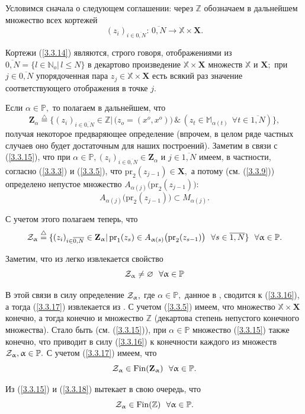 \documentclass[11pt,twoside,openany]{report}
\newcommand{\bfn}{\begin{equation}}
\newcommand{\efn}{\end{equation}}
\newcommand{\df}{\stackrel{\triangle}{=}}
\newcommand{\ov}{\overline}
\newcommand{\al}{\alpha}
\newcommand{\su}{\subset}
\newcommand{\fa}{\forall}
\newcommand{\cz}{{\cal Z}}
\newcommand{\bbz}{{\mathbb Z}}
\newcommand{\bbn}{{\mathbb N}}
\newcommand{\bbm}{{\mathbb M}}
\newcommand{\bbx}{{\mathbb X}}
\newcommand{\bbp}{{\mathbb P}}
\newcommand{\emp}{\varnothing}
\begin{document}
Условимся сначала о следующем соглашении:
через $\bbz$ обозначаем в дальнейшем
множество всех кортежей
\bfn
  \label{3.3.14}
  (z_i)_{i\in\ov{0,N}}:\,\ov{0,N}
  \longrightarrow \bbx\times \mathbf{X}
  .
\efn

Кортежи (\ref{3.3.14}) являются,
строго говоря,
отображениями из
$\ov{0,N} = \{l\in \bbn_o |\,l\leqslant N\}$
в декартово произведение $\bbx\times \mathbf{X}$
множеств $\bbx$ и $\mathbf{X};$
при $j\in \ov{0,N}$ упорядоченная пара
$z_j\in \bbx\times \mathbf{X}$
есть всякий раз значение соответствующего отображения в
точке $j.$

Если
$\al\in \bbp,$
то полагаем в дальнейшем, что
\bfn
  \label{3.3.15}
  \mathbf{Z}_\al \df \{(z_i)_{i\in\ov{0,N}}\in \bbz |\,\bigl(z_o =
  (x^o,x^o)\bigl)\,\&\,(z_t\in \bbm_{\al(t)}\ \ \fa t\in \ov{1,N})\}
  ,
\efn
получая некоторое предваряющее определение
(впрочем, в целом ряде частных случаев
оно будет достаточным для наших построений).
Заметим в связи с (\ref{3.3.15}),
что при
$\al\in \bbp, (z_i)_{i\in\ov{0,N}}\in \mathbf{Z}_\al$ и $j\in \ov{1,N}$
имеем, в частности, согласно (\ref{3.3.3}) и (\ref{3.3.5}),
что
$\mathrm{pr}_2(z_{j-1})\in \mathbf{X},$
а потому (см. (\ref{3.3.9})) определено непустое множество
$A_{\al(j)} \bigl(\mathrm{pr}_2(z_{j-1})\bigl)$:
$$
  A_{\al(j)}\bigl(\mathrm{pr}_2(z_{j-1})\bigl)\su M_{\al(j)}.
$$

С учетом этого полагаем теперь, что
\bfn
  \label{3.3.16}
  \cz_\al \df \{(z_i)_{i\in\ov{0,N}}\in \mathbf{Z}_\al |\,
  \mathrm{pr}_1(z_s)\in  A_{\al(s)}\bigl(\mathrm{pr}_2(z_{s-1})\bigl)\ \ \fa
  s\in \ov{1,N}\}\ \ \fa \al\in \bbp.
\efn

Заметим, что из \cite[(3.21)]{Cha3`}
легко извлекается свойство
\bfn
  \label{3.3.17}
  \cz_\al\neq \emp\ \ \fa \al\in \bbp
\efn

В этой связи в силу \cite[(3.5)--(3.7)]{Cha3`}
определение
$\cz_\al,$ где
$\al\in \bbp,$
данное в \cite[64]{Cha3`}, сводится к
(\ref{3.3.16}),
а тогда (\ref{3.3.17}) извлекается из
\cite[(3.21)]{Cha3`}.
С учетом (\ref{3.3.5}) имеем, что множество
$\bbx \times \mathbf{X}$ конечно,
а тогда конечно и множество $\bbz$
(декартова степень непустого конечного
множества).
Стало быть (см. (\ref{3.3.15})),
при $\al\in \bbp$ множество
(\ref{3.3.15}) также конечно, что приводит в силу (\ref{3.3.16})
к конечности каждого из множеств
$\cz_\al, \al\in \bbp.$
С учетом (\ref{3.3.17}) имеем, что
\bfn
  \label{3.3.18}
  \cz_\al\in \mathrm{Fin}(\mathbf{Z}_\al)\ \ \fa \al\in \bbp.
\efn

Из (\ref{3.3.15}) и (\ref{3.3.18}) вытекает в свою очередь, что
\bfn
  \label{3.3.19}
  \cz_\al\in \mathrm{Fin}(\bbz)\ \ \fa \al\in \bbp.
\efn
\end{document}

